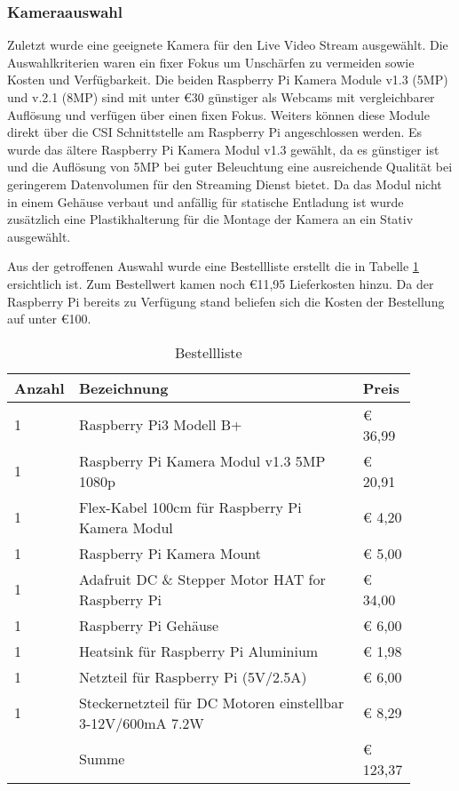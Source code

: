 \documentclass[BMR,Bachelor,ngerman]{twbook}%
\begin{document}
\subsubsection{Kameraauswahl}
Zuletzt wurde eine geeignete Kamera für den Live Video Stream ausgewählt. Die Auswahlkriterien waren ein fixer Fokus um Unschärfen zu vermeiden sowie Kosten und Verfügbarkeit. Die beiden Raspberry Pi Kamera Module v1.3 (5MP) und v.2.1 (8MP) sind mit unter \euro{30} günstiger als Webcams mit vergleichbarer Auflösung und verfügen über einen fixen Fokus. Weiters können diese Module direkt über die \ac{CSI} Schnittstelle am Raspberry Pi angeschlossen werden. Es wurde das ältere Raspberry Pi Kamera Modul v1.3 gewählt, da es günstiger ist und die Auflösung von 5MP bei guter Beleuchtung eine ausreichende Qualität bei geringerem Datenvolumen für den Streaming Dienst bietet. Da das Modul nicht in einem Gehäuse verbaut und anfällig für statische Entladung ist wurde zusätzlich eine Plastikhalterung für die Montage der Kamera an ein Stativ ausgewählt.\\\par
Aus der getroffenen Auswahl wurde eine Bestellliste erstellt die in Tabelle \ref{tab:order} ersichtlich ist. Zum Bestellwert kamen noch \euro{11,95} Lieferkosten hinzu. Da der Raspberry Pi bereits zu Verfügung stand beliefen sich die Kosten der Bestellung auf unter \euro{100}.
\begin{table}[H]
\centering
\caption{Bestellliste}
\label{tab:order}
\begin{tabular}{| p{0.1\linewidth} | p{0.7\linewidth} | p{0.1\linewidth} |}\hline
\rowcolor[gray]{0.8} Anzahl & Bezeichnung & Preis\\\hline
	1 & Raspberry Pi3 Modell B+ & \euro{ 36,99}\\\hline
	1 & Raspberry Pi Kamera Modul v1.3 5MP 1080p & \euro{ 20,91}\\\hline
	1 & Flex-Kabel 100cm für Raspberry Pi Kamera Modul & \euro{ 4,20}\\\hline
	1 & Raspberry Pi Kamera Mount & \euro{ 5,00}\\\hline
	1 & Adafruit DC \& Stepper Motor HAT for Raspberry Pi & \euro{ 34,00}\\\hline
	1 & Raspberry Pi Gehäuse & \euro{ 6,00}\\\hline
	1 & Heatsink für Raspberry Pi Aluminium & \euro{ 1,98}\\\hline
	1 & Netzteil für Raspberry Pi (5V/2.5A) &\euro{ 6,00}\\\hline
	1 & Steckernetzteil für DC Motoren einstellbar 3-12V/600mA 7.2W & \euro{ 8,29}\\\hline
	& Summe& \cellcolor[gray]{0.9}\euro{ 123,37}\\\hline
\end{tabular}
\end{table}
%
\end{document}
